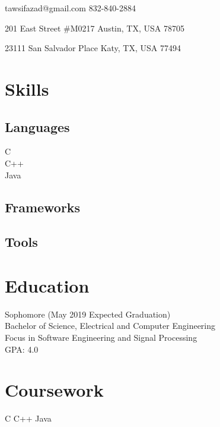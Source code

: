 \documentclass{cv_class}
\begin{document}
\contact
    {tawsifazad@gmail.com}
    {832-840-2884}
\address
    {Local}
    {201 East  Street \#M0217}
    {Austin, TX, USA}
    {78705}
\address
    {Permanent}
    {23111 San Salvador Place}
    {Katy, TX, USA}
    {77494}
\begin{twocols}
\section{Skills}
    \subsection{Languages}
    C\\
    C++\\
    Java\\
    \subsection{Frameworks}
    \subsection{Tools}
\colsep
\section{Education}
Sophomore (May 2019 Expected Graduation) \\
Bachelor of Science, Electrical and Computer Engineering \\
Focus in Software Engineering and Signal Processing \\
GPA: 4.0
\section{Coursework}
\bullets
{C}
{C++}
{Java}
\end{twocols}
\end{document}
